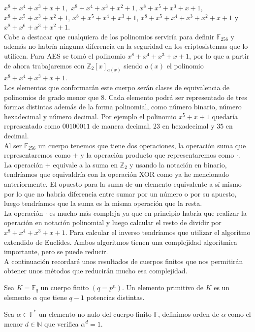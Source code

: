 $x^8+x^4+x^3+x+1$, $\:x^8+x^4+x^3+x^2+1$, $x^8+x^5+x^3+x+1$, $x^8+x^5+x^3+x^2+1$, $x^8+x^5+x^4+x^3+1$, $x^8+x^5+x^4+x^3+x^2+x+1$ y $x^8+x^6+x^3+x^2+1$.\\ 
Cabe a destacar que cualquiera de los polinomios serviría para definir $\mathbb{F}_{256}$ y además no habría ninguna diferencia en la seguridad en los criptosistemas que lo utilicen. 
Para AES se tomó el polinomio $x^8+x^4+x^3+x+1$, por lo que a partir de ahora trabajaremos con $\mathbb{Z}_2[x]_{a(x)}$ siendo $a(x)$ el polinomio $x^8+x^4+x^3+x+1$.\\
Los elementos que conformarán este cuerpo serán clases de equivalencia de polinomios  de grado menor que 8. Cada elemento podrá ser representado de tres formas distintas además de la forma polinomial, como número binario, número hexadecimal y número decimal. Por ejemplo el polinomio $x^5+x+1$ quedaría representado como $00100011$ de manera decimal, $23$ en hexadecimal y $35$ en decimal.\\
Al ser $\mathbb{F}_{256}$ un cuerpo tenemos que tiene dos operaciones, la operación suma que representaremos como $+$ y la operación producto que representaremos como $\cdot$.\\
La operación $+$ equivale a la suma en $\mathbb{Z}_2$ y usando la notación en binario, tendríamos que equivaldría con la operación XOR como ya he mencionado anteriormente. El opuesto para la suma de un elemento equivalente a sí mismo por lo que no habría diferencia entre sumar por un número o por su apuesto, luego tendríamos que la suma es la misma operación que la resta.\\
La operación $\cdot$  es mucho más compleja ya que en principio habría que realizar la operación en notación polinomial y luego calcular el resto de dividir por $x^8+x^4+x^3+x+1$. Para calcular el inverso tendríamos que utilizar el algoritmo extendido de Euclídes. Ambos algoritmos tienen una complejidad algorítmica importante, pero se puede reducir.\\
A continuación recordaré unos resultados de cuerpos finitos que nos permitirán obtener unos métodos que reducirán mucho esa complejidad.\\
\begin{definicion}
	Sea $K=\mathbb{F}_q$ un cuerpo finito $(q=p^n)$. Un elemento primitivo de $K$ es un elemento $\alpha$ que tiene $q-1$ potencias distintas.
\end{definicion}

\begin{definicion}
		Sea $\alpha \in \mathbb{F}^*$ un elemento no nulo del cuerpo finito $\mathbb{F}$, definimos orden de $\alpha$ como el menor $d\in \mathbb{N}$ que verifica $\alpha^d=1$.
\end{definicion}

